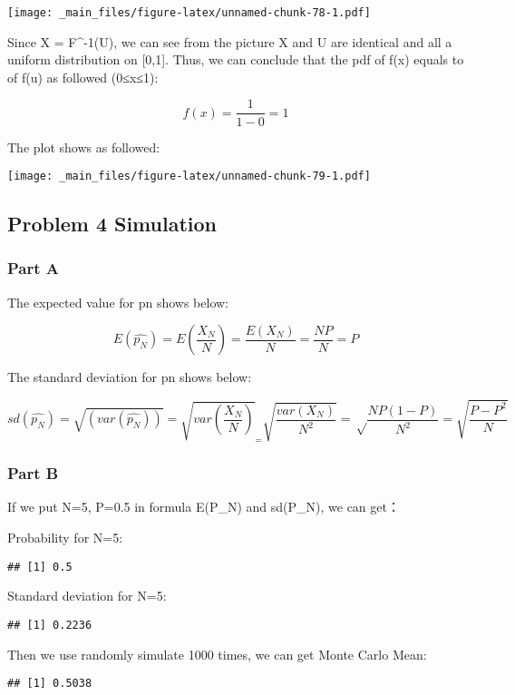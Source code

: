 \documentclass[
]{article}
\begin{document}
\texttt{[image: \_main\_files/figure-latex/unnamed-chunk-78-1.pdf]}

Since X = F\^{}-1(U), we can see from the picture X and U are identical and all a uniform distribution on {[}0,1{]}. Thus, we can conclude that the pdf of f(x) equals to of f(u) as followed (0≤x≤1):

\[
f(x) = \frac {1}{1-0} = 1 
\]

The plot shows as followed:

\texttt{[image: \_main\_files/figure-latex/unnamed-chunk-79-1.pdf]}

\hypertarget{problem-4-simulation}{%
\subsection{Problem 4 Simulation}\label{problem-4-simulation}}

\hypertarget{part-a-8}{%
\subsubsection{Part A}\label{part-a-8}}

The expected value for pn shows below:

\[
E(\hat{p_N}) = E(\frac{X_N}{N}) = \frac{E(X_N)}{N} = \frac{NP}{N} = P
\]

The standard deviation for pn shows below:

\[
sd(\hat{p_N}) = \sqrt {(var(\hat{p_N}))} = \sqrt {var(\frac{X_N}{N})}_ = \sqrt {\frac{var(X_N)}{N^2}} = \sqrt \frac{NP(1-P)}{N^2} = \sqrt{\frac {P-P^2}{N}}
\]

\hypertarget{part-b-8}{%
\subsubsection{Part B}\label{part-b-8}}

If we put N=5, P=0.5 in formula E(P\_N) and sd(P\_N), we can get：

Probability for N=5:

\begin{verbatim}
## [1] 0.5
\end{verbatim}

Standard deviation for N=5:

\begin{verbatim}
## [1] 0.2236
\end{verbatim}

Then we use randomly simulate 1000 times, we can get Monte Carlo Mean:

\begin{verbatim}
## [1] 0.5038
\end{verbatim}
\end{document}
